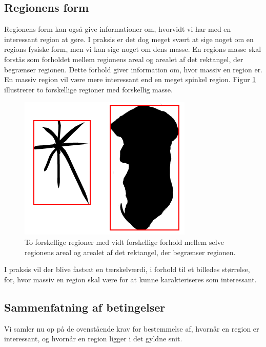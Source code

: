 {\subsection{Regionens form}
Regionens form kan også give informationer om, hvorvidt vi har med en
interessant region at gøre.  I praksis er det dog meget svært at sige
noget om en regions fysiske form, men vi kan sige noget om dens masse.
En regions masse skal forstås som forholdet mellem regionens areal og
arealet af det rektangel, der begrænser regionen.  Dette forhold giver
information om, hvor massiv en region er.  En massiv region vil være
mere interessant end en meget spinkel region.  Figur \ref{region_mass}
illustrerer to forskellige regioner med forskellig masse.
\begin{figure}[h]
    \begin{center}
        \includegraphics[scale=\imgscale,angle=0]{afsnit/vores_implementation/billeder/naiv_algoritme/bbox_area_ratio}
    \end{center}
    \caption[Regioners masse]{To forskellige regioner med vidt forskellige forhold
    mellem selve regionens areal og arealet af det rektangel, der
    begrænser regionen.}
    \label{region_mass}
\end{figure}
I praksis vil der blive fastsat en tærskelværdi, i forhold til et
billedes størrelse, for, hvor massiv en region skal være for at kunne
karakteriseres som interessant.

\subsection{Sammenfatning af betingelser}
Vi samler nu op på de ovenstående krav for bestemmelse af, hvornår en
region er interessant, og hvornår en region ligger i det gyldne snit.

}
